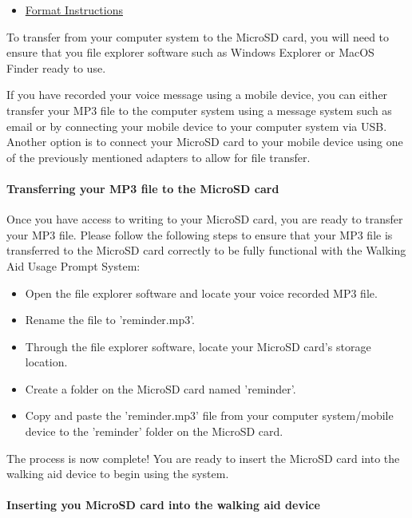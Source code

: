 				\begin{itemize}
					\item \href{https://www.bu.edu/comtech/students/technical-guides/hardware/how-to-format-hard-drives/}{Format Instructions}
				\end{itemize}

				To transfer from your computer system to the MicroSD card, you will need to ensure that you file explorer software such as Windows Explorer or MacOS Finder ready to use.

				If you have recorded your voice message using a mobile device, you can either transfer your MP3 file to the computer system using a message system such as email or by connecting your mobile device to your computer system via USB. Another option is to connect your MicroSD card to your mobile device using one of the previously mentioned adapters to allow for file transfer.

				\paragraph{Transferring your MP3 file to the MicroSD card}\mbox{}

				Once you have access to writing to your MicroSD card, you are ready to transfer your MP3 file. Please follow the following steps to ensure that your MP3 file is transferred to the MicroSD card correctly to be fully functional with the Walking Aid Usage Prompt System:

				\begin{itemize}
					\item Open the file explorer software and locate your voice recorded MP3 file.
					\item Rename the file to 'reminder.mp3'.
					\item Through the file explorer software, locate your MicroSD card's storage location.
					\item Create a folder on the MicroSD card named 'reminder'.
					\item Copy and paste the 'reminder.mp3' file from your computer system/mobile device to the 'reminder' folder on the MicroSD card.
				\end{itemize}

				The process is now complete! You are ready to insert the MicroSD card into the walking aid device to begin using the system.

				\paragraph{Inserting you MicroSD card into the walking aid device}\mbox{}

